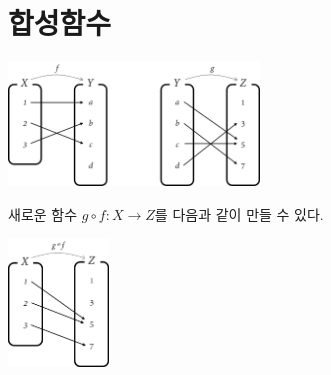 \documentclass{oblivoir}
\begin{document}
\section{합성함수}
%
\label{composition1}
\begin{center}
\includegraphics[width=0.5\textwidth]{composition_1-1}
\end{center}
새로운 함수 \(g\circ f:X\to Z\)를 다음과 같이 만들 수 있다.
\begin{center}
\includegraphics[width=0.2\textwidth]{composition_1-2}
\end{center}
\end{document}
